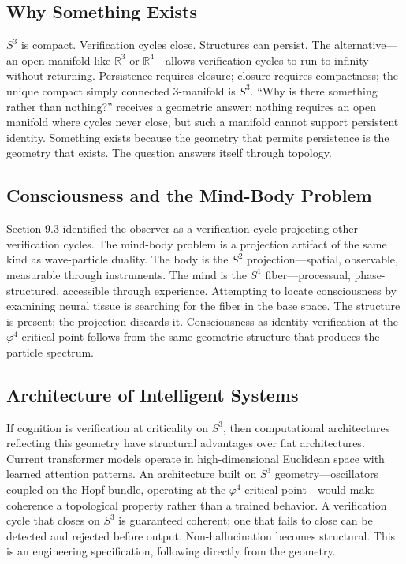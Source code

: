 \documentclass[12pt]{article}
\begin{document}
\subsection{Why Something Exists}

$S^3$ is compact. Verification cycles close. Structures can persist. The alternative---an open manifold like $\mathbb{R}^3$ or $\mathbb{R}^4$---allows verification cycles to run to infinity without returning. Persistence requires closure; closure requires compactness; the unique compact simply connected 3-manifold is $S^3$. ``Why is there something rather than nothing?'' receives a geometric answer: nothing requires an open manifold where cycles never close, but such a manifold cannot support persistent identity. Something exists because the geometry that permits persistence is the geometry that exists. The question answers itself through topology.

\subsection{Consciousness and the Mind-Body Problem}

Section 9.3 identified the observer as a verification cycle projecting other verification cycles. The mind-body problem is a projection artifact of the same kind as wave-particle duality. The body is the $S^2$ projection---spatial, observable, measurable through instruments. The mind is the $S^1$ fiber---processual, phase-structured, accessible through experience. Attempting to locate consciousness by examining neural tissue is searching for the fiber in the base space. The structure is present; the projection discards it. Consciousness as identity verification at the $\varphi^4$ critical point follows from the same geometric structure that produces the particle spectrum.

\subsection{Architecture of Intelligent Systems}

If cognition is verification at criticality on $S^3$, then computational architectures reflecting this geometry have structural advantages over flat architectures. Current transformer models operate in high-dimensional Euclidean space with learned attention patterns. An architecture built on $S^3$ geometry---oscillators coupled on the Hopf bundle, operating at the $\varphi^4$ critical point---would make coherence a topological property rather than a trained behavior. A verification cycle that closes on $S^3$ is guaranteed coherent; one that fails to close can be detected and rejected before output. Non-hallucination becomes structural. This is an engineering specification, following directly from the geometry.
\end{document}
